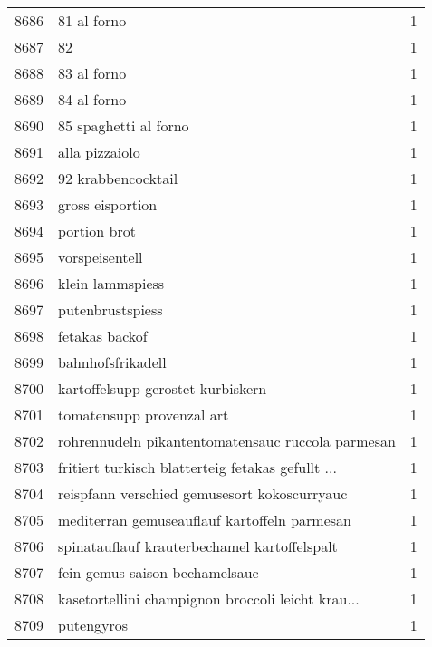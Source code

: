 \begin{tabular}{llr}
8686 &                                        81 al forno &      1 \\
8687 &                                                 82 &      1 \\
8688 &                                        83 al forno &      1 \\
8689 &                                        84 al forno &      1 \\
8690 &                              85 spaghetti al forno &      1 \\
8691 &                                     alla pizzaiolo &      1 \\
8692 &                                 92 krabbencocktail &      1 \\
8693 &                                   gross eisportion &      1 \\
8694 &                                       portion brot &      1 \\
8695 &                                     vorspeisentell &      1 \\
8696 &                                   klein lammspiess &      1 \\
8697 &                                   putenbrustspiess &      1 \\
8698 &                                     fetakas backof &      1 \\
8699 &                                  bahnhofsfrikadell &      1 \\
8700 &                  kartoffelsupp gerostet kurbiskern &      1 \\
8701 &                          tomatensupp provenzal art &      1 \\
8702 &  rohrennudeln pikantentomatensauc ruccola parmesan &      1 \\
8703 &  fritiert turkisch blatterteig fetakas gefullt ... &      1 \\
8704 &       reispfann verschied gemusesort kokoscurryauc &      1 \\
8705 &       mediterran gemuseauflauf kartoffeln parmesan &      1 \\
8706 &       spinatauflauf krauterbechamel kartoffelspalt &      1 \\
8707 &                     fein gemus saison bechamelsauc &      1 \\
8708 &  kasetortellini champignon broccoli leicht krau... &      1 \\
8709 &                                         putengyros &      1 \\

\end{tabular}
